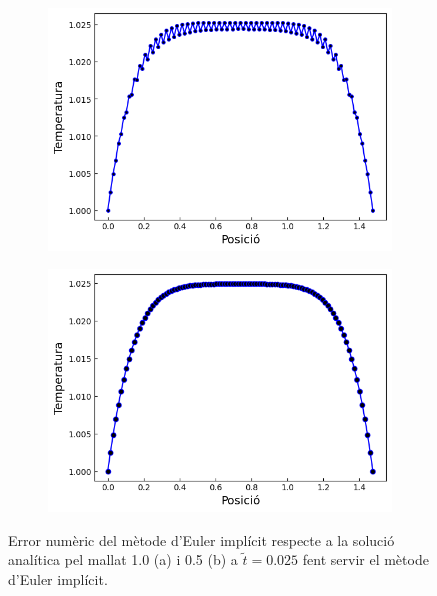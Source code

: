 \documentclass{article}
\begin{document}
\begin{figure}[h]
    \centering
    \begin{subfigure}[b]{0.35\textwidth}
        \includegraphics[width=\textwidth]{images/T_vs_z_at1.png} 
        \caption{}
        \label{fig:err_euler_imp_at1}
    \end{subfigure}
    \hspace{1.5cm}
    \begin{subfigure}[b]{0.35\textwidth}
        \includegraphics[width=\textwidth]{images/T_vs_z_at2.png}
        \caption{} 
        \label{fig:err_euler_imp_at2}
    \end{subfigure}
    \caption{Error numèric del mètode d'Euler implícit respecte a la solució analítica pel mallat 1.0 (a) i 0.5 (b) a $\tilde{t}=0.025$ fent servir el mètode d'Euler implícit.}
    \label{fig:err_euler_implicit}
\end{figure}
\end{document}
